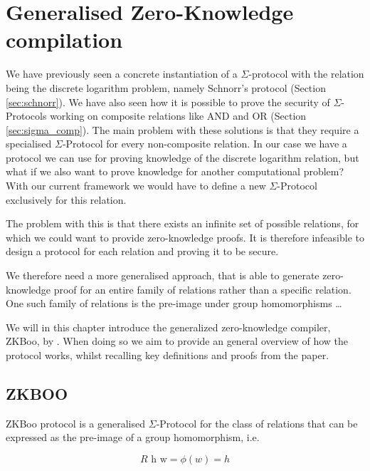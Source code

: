 \chapter{Generalised Zero-Knowledge compilation}
\label{ch:general_zk}
We have previously seen a concrete instantiation of a $\Sigma$-protocol with the
relation being the discrete logarithm problem, namely Schnorr's protocol
(Section \ref{sec:schnorr}).
We have also seen how it is possible to prove the security of $\Sigma$-Protocols
working on composite relations like AND and OR (Section \ref{sec:sigma_comp}).
The main problem with these solutions is that they require a specialised
$\Sigma$-Protocol for every non-composite relation. In our case we have a
protocol we can use for proving knowledge of the discrete logarithm relation,
but what if we also want to prove knowledge for another computational problem?
With our current framework we would have to define a new $\Sigma$-Protocol
exclusively for this relation.

The problem with this is that there exists an infinite set of possible
relations, for which we could want to provide zero-knowledge proofs. It is
therefore infeasible to design a protocol for each relation and proving it to be
secure.

We therefore need a more generalised approach, that is able to generate
zero-knowledge proof for an entire family of relations rather than a specific relation.
One such family of relations is the pre-image under group homomorphisms \dots

We will in this chapter introduce the generalized zero-knowledge compiler,
ZKBoo, by \citet{zkboo}. When doing so we aim to provide an general overview
of how the protocol works, whilst recalling key definitions and proofs from the paper.

\section{ZKBOO}
\label{sec:zkboo}
ZKBoo protocol is a generalised $\Sigma$-Protocol for the class of relations that can be
expressed as the pre-image of a group homomorphism, i.e.

\[
  R \text{ h w} = \phi(w) = h
\]

